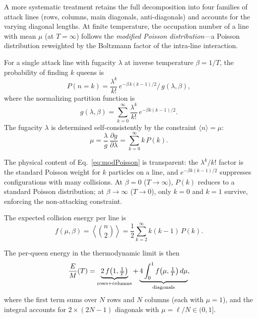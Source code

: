 \documentclass[aps, pre, reprint, amsmath, amssymb, superscriptaddress, floatfix]{revtex4-2}
\begin{document}
A more systematic treatment retains the full decomposition into
four families of attack lines (rows, columns, main diagonals,
anti-diagonals) and accounts for the varying diagonal lengths.
At finite temperature, the occupation number of a line with mean
$\mu$ (at $T = \infty$) follows the
\textit{modified Poisson distribution}---a Poisson distribution
reweighted by the Boltzmann factor of the intra-line interaction.

For a single attack line with fugacity $\lambda$ at inverse
temperature $\beta = 1/T$, the probability of finding $k$ queens is
\begin{equation}
  P(n = k) = \frac{\lambda^k}{k!}\,
  e^{-\beta\,k(k-1)/2}\Big/\,g(\lambda, \beta),
  \label{eq:modPoisson}
\end{equation}
where the normalizing partition function is
\begin{equation}
  g(\lambda, \beta) = \sum_{k=0}^\infty
  \frac{\lambda^k}{k!}\,e^{-\beta k(k-1)/2}.
  \label{eq:g_def}
\end{equation}
The fugacity $\lambda$ is determined self-consistently by the
constraint $\langle n \rangle = \mu$:
\begin{equation}
  \mu = \frac{\lambda}{g}\,\frac{\partial g}{\partial \lambda}
  = \sum_{k=0}^\infty k\,P(k).
  \label{eq:mu_constraint}
\end{equation}

The physical content of Eq.~\eqref{eq:modPoisson} is transparent:
the $\lambda^k/k!$ factor is the standard Poisson weight for $k$
particles on a line, and $e^{-\beta k(k-1)/2}$ suppresses
configurations with many collisions.  At $\beta = 0$ ($T \to \infty$),
$P(k)$ reduces to a standard Poisson distribution; at $\beta \to
\infty$ ($T \to 0$), only $k = 0$ and $k = 1$ survive, enforcing the
non-attacking constraint.

The expected collision energy per line is
\begin{equation}
  f(\mu, \beta) = \left\langle\binom{n}{2}\right\rangle
  = \frac{1}{2}\sum_{k=2}^{\infty} k(k-1)\,P(k).
  \label{eq:f_def}
\end{equation}

The per-queen energy in the thermodynamic limit is then
\begin{equation}
  \frac{E}{M}(T) = \underbrace{2\,f\!\left(1,\tfrac{1}{T}\right)
  }_{\rm rows + columns}
  + \underbrace{4\int_0^1 f\!\left(\mu,\tfrac{1}{T}\right)d\mu
  }_{\rm diagonals},
  \label{eq:E_MF}
\end{equation}
where the first term sums over $N$ rows and $N$ columns (each with
$\mu = 1$), and the integral accounts for $2 \times (2N-1)$ diagonals
with $\mu = \ell/N \in (0,1]$.
\end{document}
